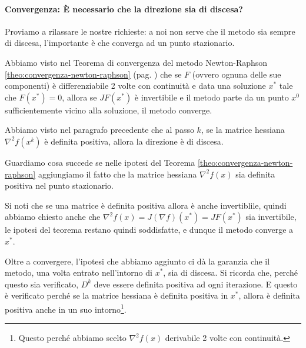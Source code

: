 \paragraph{Convergenza: \`E necessario che la direzione sia di discesa?}
Proviamo a rilassare le nostre richieste: a noi non serve che il
metodo sia sempre di discesa, l'importante \`e che converga ad un punto
stazionario.

Abbiamo visto nel Teorema di convergenza del metodo Newton-Raphson
\ref{theo:convergenza-newton-raphson} (pag. \pageref{theo:convergenza-newton-raphson}) che se $F$ (ovvero ognuna delle
sue componenti) \`e differenziabile 2 volte con continuit\`a e data una
soluzione $x^*$ tale che $F(x^*) =0$, allora se $JF(x^{*})$
\`e invertibile e il metodo parte da un punto $x^0$
sufficientemente vicino alla soluzione, il metodo converge.


Abbiamo visto nel paragrafo precedente che al passo $k$, se la matrice hessiana $\nabla^2 f(x^k)$ \`e
definita positiva, allora la direzione \`e di discesa.

Guardiamo cosa succede se nelle
ipotesi del Teorema \ref{theo:convergenza-newton-raphson} aggiungiamo il fatto che la
matrice hessiana $\nabla^2f(x)$ sia definita positiva nel punto
stazionario.

Si noti che se una matrice \`e definita positiva allora \`e anche
invertiblile, quindi abbiamo chiesto anche che $\nabla^2f(x) =
J(\nabla f)(x^{*}) = JF(x^{*})$ sia invertibile, le ipotesi del
teorema restano quindi soddisfatte, e dunque il metodo converge a $x^*$.

Oltre a convergere, l'ipotesi che abbiamo aggiunto ci dà la garanzia che il metodo, una volta entrato nell'intorno di $x^*$, sia di discesa. Si ricorda che, perché questo sia verificato, $D^k$ deve essere definita positiva ad ogni iterazione. E questo è verificato perché se la matrice hessiana \`e definita positiva in $x^*$,
allora \`e definita positiva anche in un suo intorno\footnote{Questo
perch\'e abbiamo scelto $\nabla^2 f(x)$ derivabile 2 volte con continuità.}.


